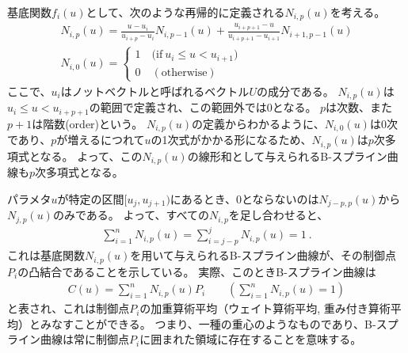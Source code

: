 \clearpage
基底関数$f_i(u)$として、次のような再帰的に定義される$N_{i, p}(u)$を考える。
\begin{gather*}
  N_{i, p}(u)
  = \frac{u-u_i}{u_{i+p}-u_i}N_{i, p-1}(u)
    +\frac{u_{i+p+1}-u}{u_{i+p+1}-u_{i+1}}N_{i+1, p-1}(u)\\
  N_{i, 0}(u)
  = \left\{
    \begin{array}{l}
      1\quad \big(\text{if}~u_i \leq u < u_{i+1}\big)\\
      0\quad (\text{otherwise})
    \end{array}
    \right.
\end{gather*}
ここで、$u_i$はノットベクトルと呼ばれるベクトル$U$の成分である。
$N_{i, p}(u)$は$u_i \leq u < u_{i+p+1}$の範囲で定義され、この範囲外では$0$となる。
$p$は次数、また$p+1$は階数(order)という。
$N_{i, p}(u)$の定義からわかるように、$N_{i, 0}(u)$は0次であり、$p$が増えるにつれて$u$の1次式がかかる形になるため、$N_{i, p}(u)$は$p$次多項式となる。
よって、この$N_{i, p}(u)$の線形和として与えられるB-スプライン曲線も$p$次多項式となる。

パラメタ$u$が特定の区間$[u_j , u_{j+1})$にあるとき、0とならないのは$N_{j-p, p}(u)$から$N_{j, p}(u)$のみである。
よって、すべての$N_{i, p}$を足し合わせると、
\begin{align*}
  \sum_{i=1}^nN_{i, p}(u) = \sum_{i=j-p}^j\!\!N_{i, p}(u) = 1\ .
\end{align*}
これは基底関数$N_{i, p}(u)$を用いて与えられるB-スプライン曲線が、その制御点$P_i$の凸結合であることを示している。
実際、このときB-スプライン曲線は
\begin{align*}
  C(u) = \sum_{i=1}^nN_{i, p}(u)P_i\qquad\left(\sum_{i=1}^nN_{i, p}(u) =1\right)
\end{align*}
と表され、これは制御点$P_i$の加重算術平均（ウェイト算術平均, 重み付き算術平均）とみなすことができる。
つまり、一種の重心のようなものであり、B-スプライン曲線は常に制御点$P_i$に囲まれた領域に存在することを意味する。


